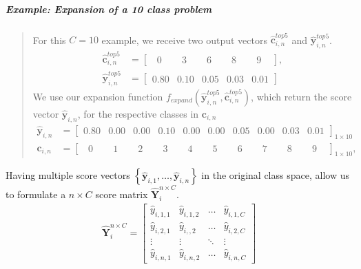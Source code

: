 \subparagraph{Example: Expansion of a 10 class problem} 
\blockquote[]{	 	
	For this $C=10$ example, we receive two output vectors $\bm{\hat{c}}_{i,n}^{top5}$ and $ \bm{\hat{y}}_{i,n}^{top5}$.
	\begin{align*}
	\bm{\hat{c}}_{i,n}^{top5} &= \begin{bmatrix}
	\phantom{0}0\phantom{.0} & \phantom{0}3\phantom{.0} & \phantom{0}6\phantom{.0} & \phantom{0}8\phantom{.0} & \phantom{0}9\phantom{.0}
	\end{bmatrix},\\
	\bm{\hat{y}}_{i,n}^{top5} &= \begin{bmatrix}
	0.80 & 0.10 & 0.05 & 0.03 & 0.01
	\end{bmatrix}
	\end{align*}
	We use our expansion function $ f_{expand}\left(\bm{\hat{y}}_{i,n}^{top5},\bm{\hat{c}}_{i,n}^{top5}\right) $, which return the score vector $ \mathbf{\hat{y}}_{i,n}$, for the respective classes in $ \bm{c}_{i,n} $
	\begin{align*}
	\mathbf{\hat{y}}_{i,n}  &= \begin{bmatrix}
	0.80 & 0.00 & 0.00 & 0.10 & 0.00 & 0.00 & 0.05 & 0.00 & 0.03 & 0.01
	\end{bmatrix}_{1 \times 10} \\
	\bm{c}_{i,n} &= \begin{bmatrix}
	\phantom{0}0\phantom{.0} & \phantom{0}1\phantom{.0} & \phantom{0}2\phantom{.0} & \phantom{0}3\phantom{.0} & \phantom{0}4\phantom{.0} & \phantom{0}5\phantom{.0} & \phantom{0}6\phantom{.0} & \phantom{0}7\phantom{.0} & \phantom{0}8\phantom{.0} & \phantom{0}9\phantom{.0}
	\end{bmatrix}_{1 \times 10},
	\end{align*}
}      

Having multiple score vectors $ \left\{\bm{\hat{y}}_{i,1}, \dots, \bm{\hat{y}}_{i,n}\right\}  $ in the original class space, allow us to formulate a $ n \times C $ score matrix $ \bm{\hat{Y}}_{i}^{n \times C} $.
\begin{align}
	\bm{\hat{Y}}_{i}^{n \times C} =
	\begin{bmatrix}
		\hat{y}_{i,1,1} & \hat{y}_{i,1,2} & \dots & \hat{y}_{i,1,C} \\
		\hat{y}_{i,2,1} & \hat{y}_{i,,2} & \dots & \hat{y}_{i,2,C} \\
		\vdots & \vdots & \ddots & \vdots \\
		\hat{y}_{i,n,1} & \hat{y}_{i,n,2} & \dots & \hat{y}_{i,n,C}
	\end{bmatrix}
\end{align}

